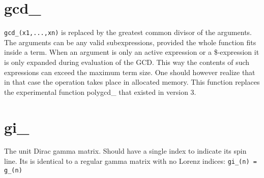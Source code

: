 \section{gcd\_}
\label{fungcd}
\noindent \verb:gcd_(x1,...,xn): is replaced by the greatest common divisor 
of the arguments. The arguments can be any valid subexpressions, provided 
the whole function fits inside a term. When an argument is only an active 
expression or a \$-expression it is only expanded during evaluation of the 
GCD. This way the contents of such expressions can exceed the maximum term 
size. One should however realize that in that case the operation takes 
place in allocated memory.
This function replaces the experimental function 
polygcd\_ that existed in 
version 3.


\section{gi\_}
\label{fungi}
\noindent The unit Dirac gamma matrix. Should have a single index 
to indicate its spin line. Its is identical to a regular gamma matrix with 
no Lorenz indices: \verb:gi_(n) = g_(n):


